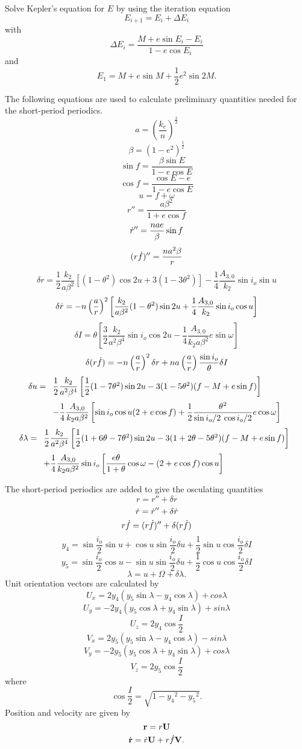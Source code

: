 Solve Kepler's equation for $E$ by using the iteration equation
\[E_{i+1}=E_i+\Delta E_i\]
with
\[\Delta E_i=\dfrac{M+e\sin E_i-E_i}{1-e\cos E_i}\]
and
\[E_1=M+e\sin M+\dfrac12e^2\sin 2M.\]

The following equations are used to calculate preliminary quantities needed for
the short-period periodics.
\[a=\left(\dfrac{k_e}n\right)^{\frac23}\]
\[\beta=(1-e^2)^{\frac12}\]
\[\sin f=\dfrac{\beta\sin E}{1-e\cos E}\]
\[\cos f=\dfrac{\cos E-e}{1-e\cos E}\]
\[u=f+\omega\]
\[r''=\dfrac{a\beta^2}{1+e\cos f}\]
\[\dr''=\dfrac{nae}\beta\sin f\]
\[(r\df)''=\dfrac{na^2\beta}r\]
\[\delta r=\dfrac12\dfrac{k_2}{a\beta^2}[(1-\theta^2)\cos 2u
+3(1-3\theta^2)]-\dfrac14\dfrac{A_{3,0}}{k_2}\sin i_o\sin u\]
\[\delta\dr=-n\left(\dfrac ar\right)^2\left[\dfrac{k_2}{a\beta^2}(1-\theta^2)\sin 2u
+\dfrac14\dfrac{A_{3,0}}{k_2}\sin i_o\cos u\right]\]
\[\delta I=\theta\left[\dfrac32\dfrac{k_2}{a^2\beta^4}\sin i_o\cos 2u
-\dfrac14\dfrac{A_{3,0}}{k_2a\beta^2}e\sin\omega\right]\]
\[\delta(r\df)=-n\left(\dfrac ar\right)^2\delta r+na\left(\dfrac ar\right)\dfrac{\sin i_o}\theta\delta I\]
\[\delta u=\begin{array}[t]{l}
\dfrac12\dfrac{k_2}{a^2\beta^4}\left[\dfrac12(1-7\theta^2)\sin 2u-3(1-5\theta^2)(f-M+e\sin f)\right]\\[12pt]
-\dfrac14\dfrac{A_{3,0}}{k_2a\beta^2}\left[\sin i_o\cos u(2+e\cos f)
+\dfrac12\dfrac{\theta^2}{\sin i_o/2\:\cos i_o/2}e\cos\omega\right]
\end{array}\]
\[\delta\lambda=\begin{array}[t]{l}
\dfrac12\dfrac{k_2}{a^2\beta^4}\left[\dfrac12(1+6\theta-7\theta^2)\sin 2u
-3(1+2\theta-5\theta^2)(f-M+e\sin f)\right]\\[12pt]
+\dfrac14\dfrac{A_{3,0}}{k_2a\beta^2}\sin i_o
\left[\dfrac{e\theta}{1+\theta}\cos\omega-(2+e\cos f)\cos u\right]
\end{array}\]

The short-period periodics are added to give the osculating quantities
\[r=r''+\delta r\]
\[\dr=\dr''+\delta\dr\]
\[r\df=(r\df)''+\delta(r\df)\]
\[y_4=\sin \dfrac{i_o}2\sin u+\cos u\sin \dfrac{i_o}2\delta u+\dfrac12\sin u\cos \dfrac{i_o}2\delta I\]
\[y_5=\sin \dfrac{i_o}2\cos u-\sin u\sin \dfrac{i_o}2\delta u+\dfrac12\cos u\cos \dfrac{i_o}2\delta I\]
\[\lambda=u+\Omega+\delta\lambda.\]
Unit orientation vectors are calculated by
\[U_x=2y_4(y_5\sin\lambda-y_4\cos\lambda)+cos\lambda\]
\[U_y=-2y_4(y_5\cos\lambda+y_4\sin\lambda)+sin\lambda\]
\[U_z=2y_4\cos \dfrac{I}2\]
\[V_x=2y_5(y_5\sin\lambda-y_4\cos\lambda)-sin\lambda\]
\[V_y=-2y_5(y_5\cos\lambda+y_4\sin\lambda)+cos\lambda\]
\[V_z=2y_5\cos \dfrac{I}2\]
where
\[\cos \dfrac{I}2=\sqrt{1-y_4{}^2-y_5{}^2}.\]
Position and velocity are given by
\[\rvec=r\Uvec\]
\[\drvec=\dr\Uvec+r\df\Vvec.\]

